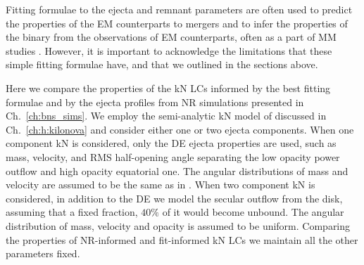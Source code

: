 
Fitting formulae to the ejecta and remnant parameters are often used to predict the 
properties of the \ac{EM} counterparts to mergers and to infer the properties of the 
binary from the observations of \ac{EM} counterparts, often as a part of \ac{MM} studies 
\citep{Dietrich:2020efo,Breschi:2021tbm,Nicholl:2021rcr,Dietrich:2020efo}.
%
However, it is important to acknowledge the limitations that these simple 
fitting formulae have, and that we outlined in the sections above. 

Here we compare the properties of the \ac{kN} \acp{LC} informed by the best fitting 
formulae and by the ejecta profiles from \ac{NR} simulations presented in 
Ch.~\ref{ch:bns_sims}. %
We employ the semi-analytic \ac{kN} model of \citet{Perego:2017wtu} discussed in 
Ch.~\ref{ch:h:kilonova} and consider either one or two ejecta components.
%
When one component \ac{kN} is considered, only the \ac{DE} ejecta properties are used, 
such as mass, velocity, and \ac{RMS} half-opening angle separating the low opacity 
power outflow and high opacity equatorial one. The angular distributions of mass and velocity 
are assumed to be the same as in \citet{Perego:2017wtu}.
When two component \ac{kN} is considered, in addition to the \ac{DE} we model the 
secular outflow from the disk, assuming that a fixed fraction, $40\%$ of it would 
become unbound. The angular distribution of mass, velocity and opacity
is assumed to be uniform. 
Comparing the properties of \ac{NR}-informed and fit-informed \ac{kN} \acp{LC} we 
maintain all the other parameters fixed.
%

